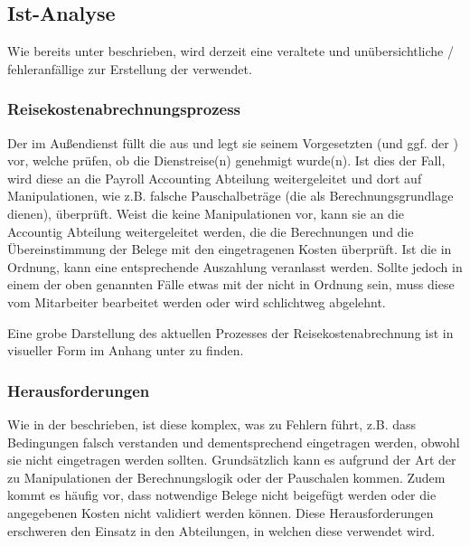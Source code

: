 \subsection{Ist-Analyse}

Wie bereits unter  beschrieben, wird derzeit eine veraltete und unübersichtliche / fehleranfällige  zur Erstellung der  verwendet. 

\subsubsection{Reisekostenabrechnungsprozess}
\label{sec:Analysephase:Reisekostenabrechnungsprozess}

Der  im Außendienst füllt die  aus und legt sie seinem Vorgesetzten (und ggf. der ) vor, welche prüfen, ob die Dienstreise(n) genehmigt wurde(n). Ist dies der Fall, wird diese an die Payroll Accounting Abteilung weitergeleitet und dort auf Manipulationen, wie z.B. falsche Pauschalbeträge (die als Berechnungsgrundlage dienen), überprüft. Weist die  keine Manipulationen vor, kann sie an die Accountig Abteilung weitergeleitet werden, die die Berechnungen und die Übereinstimmung der Belege mit den eingetragenen Kosten überprüft. Ist die  in Ordnung, kann eine entsprechende Auszahlung veranlasst werden. Sollte jedoch in einem der oben genannten Fälle etwas mit der  nicht in Ordnung sein, muss diese vom Mitarbeiter bearbeitet werden oder wird schlichtweg abgelehnt.

Eine grobe Darstellung des aktuellen Prozesses der Reisekostenabrechnung ist in visueller Form im Anhang unter  zu finden.

\subsubsection{Herausforderungen}

Wie in der  beschrieben, ist diese  komplex, was zu Fehlern führt, z.B. dass Bedingungen falsch verstanden und dementsprechend eingetragen werden, obwohl sie nicht eingetragen werden sollten. Grundsätzlich kann es aufgrund der Art der  zu Manipulationen der Berechnungslogik oder der Pauschalen kommen. Zudem kommt es häufig vor, dass notwendige Belege nicht beigefügt werden oder die angegebenen Kosten nicht validiert werden können. Diese Herausforderungen erschweren den Einsatz in den Abteilungen, in welchen diese verwendet wird.

